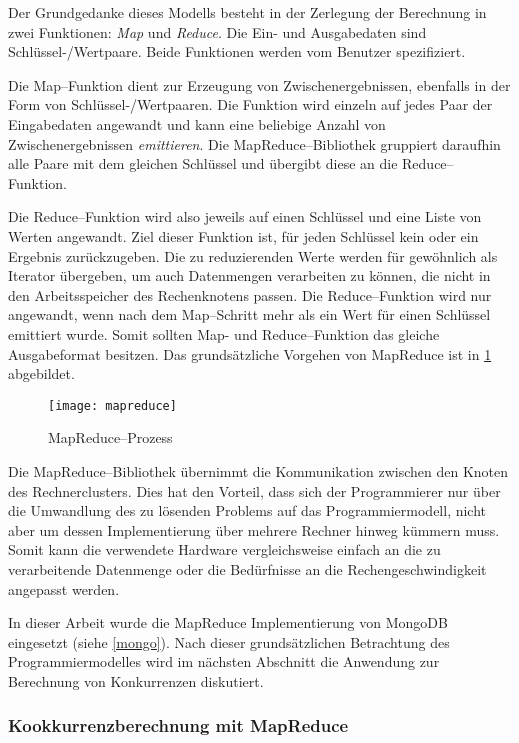  Der Grundgedanke dieses Modells besteht in der Zerlegung der Berechnung in zwei Funktionen: \emph{Map} und \emph{Reduce}. Die Ein- und Ausgabedaten sind Schlüssel-/Wertpaare. Beide Funktionen werden vom Benutzer spezifiziert.

Die Map--Funktion dient zur Erzeugung von Zwischenergebnissen, ebenfalls in der Form von Schlüssel-/Wertpaaren. Die Funktion wird einzeln auf jedes Paar der Eingabedaten angewandt und kann eine beliebige Anzahl von Zwischenergebnissen \emph{emittieren}. Die MapReduce--Bibliothek gruppiert daraufhin alle Paare mit dem gleichen Schlüssel und übergibt diese an die Reduce--Funktion.

Die Reduce--Funktion wird also jeweils auf einen Schlüssel und eine Liste von Werten angewandt. Ziel dieser Funktion ist, für jeden Schlüssel kein oder ein Ergebnis zurückzugeben. Die zu reduzierenden Werte werden für gewöhnlich als Iterator übergeben, um auch Datenmengen verarbeiten zu können, die nicht in den Arbeitsspeicher des Rechenknotens passen. Die Reduce--Funktion wird nur angewandt, wenn nach dem Map--Schritt mehr als ein Wert für einen Schlüssel emittiert wurde. Somit sollten Map- und Reduce--Funktion das gleiche Ausgabeformat besitzen. Das grundsätzliche Vorgehen von MapReduce ist in \cref{fig:mapreduce} abgebildet.

\begin{figure}
\centering
\texttt{[image: mapreduce]}
\caption{MapReduce--Prozess}
\label{fig:mapreduce}
\end{figure}

Die MapReduce--Bibliothek übernimmt die Kommunikation zwischen den Knoten des Rechnerclusters. Dies hat den Vorteil, dass sich der Programmierer nur über die Umwandlung des zu lösenden Problems auf das Programmiermodell, nicht aber um dessen Implementierung über mehrere Rechner hinweg kümmern muss. Somit kann die verwendete Hardware vergleichsweise einfach an die zu verarbeitende Datenmenge oder die Bedürfnisse an die Rechengeschwindigkeit angepasst werden.

In dieser Arbeit wurde die MapReduce Implementierung von MongoDB eingesetzt (siehe \cref{mongo}). Nach dieser grundsätzlichen Betrachtung des Programmiermodelles wird im nächsten Abschnitt die Anwendung zur Berechnung von Konkurrenzen diskutiert.


\subsubsection{Kookkurrenzberechnung mit MapReduce}
\label{mapreduce_cooccurence}

